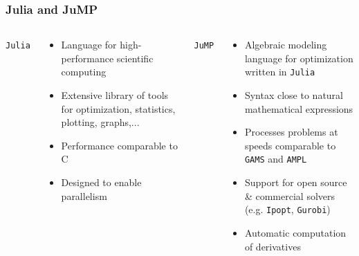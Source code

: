 \begin{frame}[t]
    \frametitle{Julia and JuMP}
    \begin{columns}
        {\tt Julia}
        \begin{small}
        \begin{itemize}
          \item Language for high-performance scientific computing
          \item Extensive library of tools  for optimization, statistics, plotting, graphs,...
          \item Performance comparable to C
          \item Designed to enable parallelism
        \end{itemize}
        \end{small}
        {\tt JuMP}
        \begin{small}
        \begin{itemize}
            \item Algebraic modeling language for optimization written in {\tt Julia}
            \item Syntax close to natural mathematical expressions
            \item Processes problems at speeds comparable to {\tt GAMS} and {\tt AMPL}
            \item Support for open source \& commercial solvers (e.g. {\tt Ipopt}, {\tt Gurobi})
            \item Automatic computation of derivatives
        \end{itemize}
        \end{small}
    \end{columns}
\end{frame}

